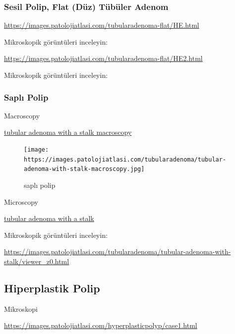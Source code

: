 \documentclass[
  letterpaper,
  DIV=11,
  numbers=noendperiod]{scrreprt}
\begin{document}
\hypertarget{sesil-polip-flat-duxfcz-tuxfcbuxfcler-adenom-1}{%
\subsubsection{Sesil Polip, Flat (Düz) Tübüler
Adenom}\label{sesil-polip-flat-duxfcz-tuxfcbuxfcler-adenom-1}}

\url{https://images.patolojiatlasi.com/tubularadenoma-flat/HE.html}

Mikroskopik görüntüleri inceleyin:

\url{https://images.patolojiatlasi.com/tubularadenoma-flat/HE2.html}

Mikroskopik görüntüleri inceleyin:

\hypertarget{saplux131-polip-1}{%
\subsubsection{Saplı Polip}\label{saplux131-polip-1}}

Macroscopy

\href{https://images.patolojiatlasi.com/tubularadenoma/tubular-adenoma-with-stalk-macroscopy.jpg}{tubular
adenoma with a stalk macroscopy}

\begin{figure}

{\centering \texttt{[image: https://images.patolojiatlasi.com/tubularadenoma/tubular-adenoma-with-stalk-macroscopy.jpg]}

}

\caption{saplı polip}

\end{figure}

Microscopy

\href{https://images.patolojiatlasi.com/tubularadenoma/tubular-adenoma-with-stalk.jpeg}{tubular
adenoma with a stalk}

Mikroskopik görüntüleri inceleyin:

\url{https://images.patolojiatlasi.com/tubularadenoma/tubular-adenoma-with-stalk/viewer_z0.html}

\hypertarget{hiperplastik-polip}{%
\subsection{Hiperplastik Polip}\label{hiperplastik-polip}}

Mikroskopi

\url{https://images.patolojiatlasi.com/hyperplasticpolyp/case1.html}
\end{document}
